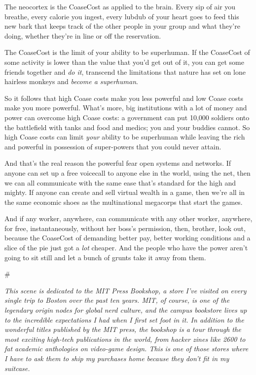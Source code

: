The neocortex is the CoaseCost as applied to the brain. Every sip
of air you breathe, every calorie you ingest, every lubdub of your
heart goes to feed this new bark that keeps track of the other
people in your group and what they're doing, whether they're in
line or off the reservation.

The CoaseCost is the limit of your ability to be superhuman. If the
CoaseCost of some activity is lower than the value that you'd get
out of it, you can get some friends together and \emph{do it},
transcend the limitations that nature has set on lone hairless
monkeys and \emph{become a superhuman}.

So it follows that high Coase costs make you less powerful and low
Coase costs make you more powerful. What's more, big institutions
with a lot of money and power can overcome high Coase costs: a
government can put 10,000 soldiers onto the battlefield with tanks
and food and medics; you and your buddies cannot. So high Coase
costs can limit \emph{your} ability to be superhuman while leaving
the rich and powerful in possession of super-powers that you could
never attain.

And that's the real reason the powerful fear open systems and
networks. If anyone can set up a free voicecall to anyone else in
the world, using the net, then we can all communicate with the same
ease that's standard for the high and mighty. If anyone can create
and sell virtual wealth in a game, then we're all in the same
economic shoes as the multinational megacorps that start the
games.

And if any worker, anywhere, can communicate with any other worker,
anywhere, for free, instantaneously, without her boss's permission,
then, brother, look out, because the CoaseCost of demanding better
pay, better working conditions and a slice of the pie just got a
\emph{lot} cheaper. And the people who have the power aren't going
to sit still and let a bunch of grunts take it away from them.

\#

\emph{This scene is dedicated to the MIT Press Bookshop, a store I've visited on every single trip to Boston over the past ten years. MIT, of course, is one of the legendary origin nodes for global nerd culture, and the campus bookstore lives up to the incredible expectations I had when I first set foot in it. In addition to the wonderful titles published by the MIT press, the bookshop is a tour through the most exciting high-tech publications in the world, from hacker zines like 2600 to fat academic anthologies on video-game design. This is one of those stores where I have to ask them to ship my purchases home because they don't fit in my suitcase.}

